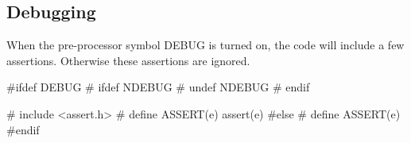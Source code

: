 %
%
\subsection{Debugging}
When the pre-processor symbol {\Tt{}DEBUG\nwendquote} is turned on, the code will
include a few assertions. Otherwise these assertions are ignored.

\nwenddocs{}\endmoddef\nwstartdeflinemarkup\nwenddeflinemarkup
#ifdef DEBUG
# ifdef NDEBUG
#  undef NDEBUG
# endif

# include <assert.h>
# define ASSERT(e) assert(e)
#else
# define ASSERT(e)
#endif
\nwendcode{}

%

